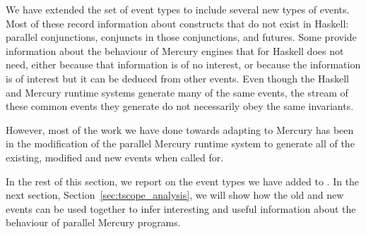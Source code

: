 
We have extended the set of \tscope event types
to include several new types of events.
Most of these record information about constructs that do not exist in Haskell:
parallel conjunctions, conjuncts in those conjunctions, and futures.
Some provide information about the behaviour of Mercury engines
that \tscope for Haskell does not need,
either because that information is of no interest,
or because the information is of interest
but it can be deduced from other events.
Even though the Haskell and Mercury runtime systems
generate many of the same events,
the stream of these common events they generate
do not necessarily obey the same invariants.

However, most of the work we have done towards adapting \tscope to Mercury
has been in the modification of the parallel Mercury runtime system
to generate all of the existing, modified and new events when called for.

In the rest of this section,
we report on the event types we have added to \tscope.
In the next section, Section~\ref{sec:tscope_analysis},
we will show how the old and new events can be used together
to infer interesting and useful information
about the behaviour of parallel Mercury programs.

